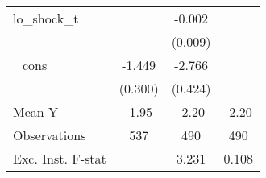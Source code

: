 {\begin{tabular}{l*{3}{c}}
\addlinespace
lo\_shock\_t  &                     &      -0.002         &                     \\
            &                     &     (0.009)         &                     \\
\addlinespace
\_cons      &      -1.449\sym{***}&      -2.766\sym{***}&                     \\
            &     (0.300)         &     (0.424)         &                     \\
\midrule
Mean Y      &       -1.95         &       -2.20         &       -2.20         \\
Observations&         537         &         490         &         490         \\
Exc. Inst. F-stat&                     &       3.231         &       0.108         \\
\bottomrule
\end{tabular}
}
